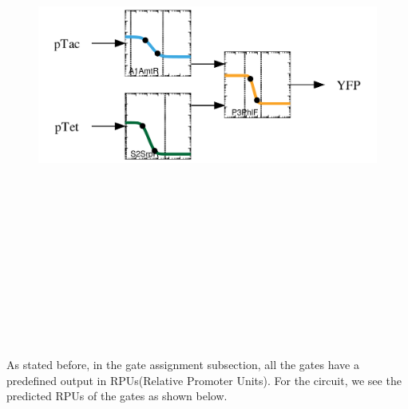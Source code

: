 \documentclass[11pt]{article}
\begin{document}
\begin{figure}[ht!]
\centering
\includegraphics[width=16cm,height=16cm,keepaspectratio]{download (1).png}
\label{Case exmaple}
\end{figure}
\\[\baselineskip]   
As stated before, in the gate assignment subsection, all the gates have a  predefined output in RPUs(Relative Promoter Units). For the circuit, we see the predicted RPUs of the gates as shown below.
\end{document}
